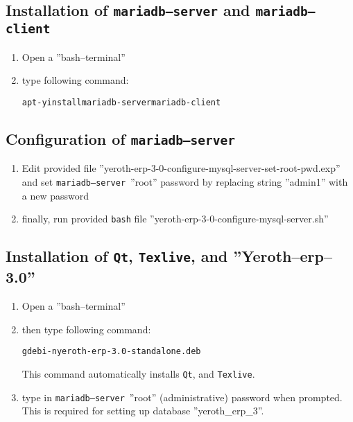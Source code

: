 \documentclass[a4paper, 10pt]{article}
\newcommand{\yerotherptroiszero}{\textbf{''Yeroth--erp--3.0''}\xspace}
\newcommand{\texlive}{\texttt{Texlive}\xspace}
\newcommand{\bash}{\texttt{bash}\xspace}
\newcommand{\qt}{\texttt{Qt}\xspace}
\newcommand{\mariadbserver}{\texttt{mariadb--server}\xspace}
\newcommand{\mariadbclient}{\texttt{mariadb--client}\xspace}
\newcommand{\rootcommand}[1]{
\begin{center}
\textcolor{purplish}{#1\xspace}
\end{center}}
\begin{document}
\subsection{Installation of \mariadbserver and \mariadbclient}

\begin{enumerate}[1)]
	\item Open a ''bash--terminal''
	\item type following command:
		\begin{alltt}
			\rootcommand{apt -y install mariadb-server mariadb-client}
		\end{alltt}		
\end{enumerate} 

\subsection{Configuration of \mariadbserver}

\begin{enumerate}[1)]
	\item Edit provided file ''yeroth-erp-3-0-configure-mysql-server-set-root-pwd.exp''
		and set \mariadbserver\ ''root'' password by replacing string 
		''admin1'' with a new password
	\item finally, run provided \bash file
		''yeroth-erp-3-0-configure-mysql-server.sh''	
\end{enumerate}

\subsection{Installation of \qt, \texlive, and \yerotherptroiszero}

\begin{enumerate}[1)]
	\item Open a ''bash--terminal''

	\item then type following command:
		\begin{alltt}
			\rootcommand{gdebi -n yeroth-erp-3.0-standalone.deb}
		\end{alltt}

	This command automatically installs \qt, and \texlive.
		
	\item type in \mariadbserver\ ''root'' (administrative)
		password when prompted. This is required
		for setting up  database ''yeroth\_erp\_3''.
\end{enumerate}
\end{document}
